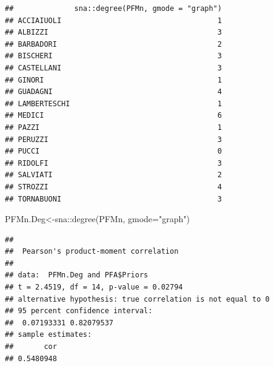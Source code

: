 \documentclass[
  notitlepage,
  onecolumn,
  openany]{book}
\newenvironment{Shaded}{\begin{snugshade}}{\end{snugshade}}
\newcommand{\AttributeTok}[1]{\textcolor[rgb]{0.77,0.63,0.00}{#1}}
\newcommand{\CommentTok}[1]{\textcolor[rgb]{0.56,0.35,0.01}{\textit{#1}}}
\newcommand{\DocumentationTok}[1]{\textcolor[rgb]{0.56,0.35,0.01}{\textbf{\textit{#1}}}}
\newcommand{\FunctionTok}[1]{\textcolor[rgb]{0.00,0.00,0.00}{#1}}
\newcommand{\NormalTok}[1]{#1}
\newcommand{\OtherTok}[1]{\textcolor[rgb]{0.56,0.35,0.01}{#1}}
\newcommand{\SpecialCharTok}[1]{\textcolor[rgb]{0.00,0.00,0.00}{#1}}
\newcommand{\StringTok}[1]{\textcolor[rgb]{0.31,0.60,0.02}{#1}}
\begin{document}
\begin{verbatim}
##              sna::degree(PFMn, gmode = "graph")
## ACCIAIUOLI                                    1
## ALBIZZI                                       3
## BARBADORI                                     2
## BISCHERI                                      3
## CASTELLANI                                    3
## GINORI                                        1
## GUADAGNI                                      4
## LAMBERTESCHI                                  1
## MEDICI                                        6
## PAZZI                                         1
## PERUZZI                                       3
## PUCCI                                         0
## RIDOLFI                                       3
## SALVIATI                                      2
## STROZZI                                       4
## TORNABUONI                                    3
\end{verbatim}

\begin{Shaded}
\begin{Highlighting}[]
\NormalTok{PFMn.Deg}\OtherTok{\textless{}{-}}\NormalTok{sna}\SpecialCharTok{::}\FunctionTok{degree}\NormalTok{(PFMn, }\AttributeTok{gmode=}\StringTok{"graph"}\NormalTok{)}
\end{Highlighting}
\end{Shaded}

\begin{Shaded}
\end{Shaded}

\begin{verbatim}
## 
##  Pearson's product-moment correlation
## 
## data:  PFMn.Deg and PFA$Priors
## t = 2.4519, df = 14, p-value = 0.02794
## alternative hypothesis: true correlation is not equal to 0
## 95 percent confidence interval:
##  0.07193331 0.82079537
## sample estimates:
##       cor 
## 0.5480948
\end{verbatim}

\begin{Shaded}
\end{Shaded}
\end{document}
